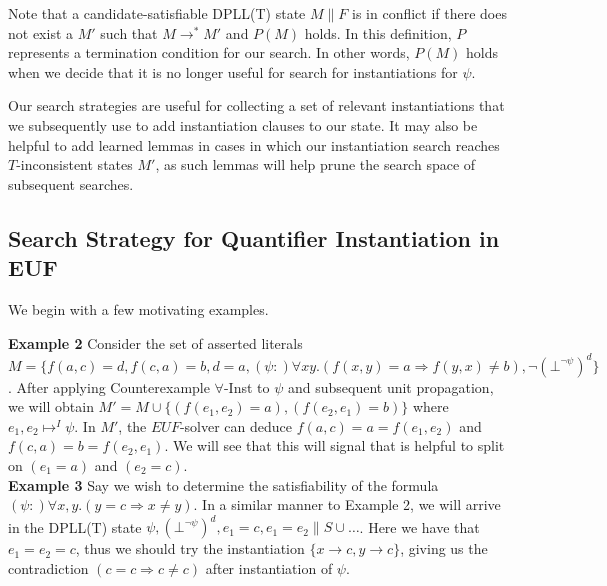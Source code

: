 \documentclass{llncs}
\begin{document}
Note that a candidate-satisfiable DPLL(T) state $M \parallel F$ is in conflict if there does not exist a $M'$ such that $M \rightarrow^\ast M'$ and $P(M)$ holds.
In this definition, $P$ represents a termination condition for our search.
In other words, $P(M)$ holds when we decide that it is no longer useful for search for instantiations for $\psi$.

Our search strategies are useful for collecting a set of relevant instantiations that we subsequently use to add instantiation clauses to our state.
It may also be helpful to add learned lemmas in cases in which our instantiation search reaches $T$-inconsistent states $M'$, as such lemmas will help prune the search space of subsequent searches.


\subsection{Search Strategy for Quantifier Instantiation in EUF}

We begin with a few motivating examples.

{\bf Example 2}
Consider the set of asserted literals $M = \{ f( a, c ) = d, f( c, a ) = b, d = a, (\psi :) \forall xy. (f( x, y ) = a \Rightarrow f( y, x ) \neq b), \neg ( \bot^{\neg \psi} )^d \}$.
After applying Counterexample $\forall$-Inst to $\psi$ and subsequent unit propagation, we will obtain $M' = M \cup \{ (f( e_1, e_2 ) = a), (f( e_2, e_1 ) = b) \}$ where $e_1, e_2 \mapsto^I \psi$.
In $M'$, the $EUF$-solver can deduce $f( a, c ) = a = f( e_1, e_2 )$ and $f( c, a ) = b = f( e_2, e_1 )$.
We will see that this will signal that is helpful to split on $( e_1 = a )$ and $( e_2 = c )$. \\

{\bf Example 3} 
Say we wish to determine the satisfiability of the formula $(\psi :) \forall x, y. ( y = c \Rightarrow x \neq y )$.
In a similar manner to Example 2, we will arrive in the DPLL(T) state $\psi, (\bot^{ \neg \psi })^d, e_1 = c, e_1 = e_2 \parallel S \cup \ldots$.
Here we have that $e_1 = e_2 = c$, thus we should try the instantiation $\{ x \rightarrow c, y \rightarrow c \}$, giving us the contradiction $( c = c \Rightarrow c \neq c )$ after instantiation of $\psi$. \\
\end{document}
